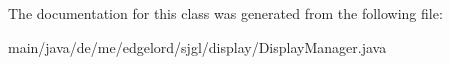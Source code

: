 The documentation for this class was generated from the following file\+:\begin{DoxyCompactItemize}
\item 
main/java/de/me/edgelord/sjgl/display/Display\+Manager.\+java\end{DoxyCompactItemize}

